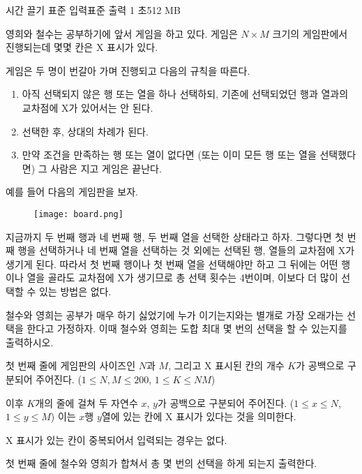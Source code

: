 \begin{problem}{시간 끌기}
    {표준 입력}{표준 출력}
    {1 초}{512 MB}{}
    
    영희와 철수는 공부하기에 앞서 게임을 하고 있다. 게임은 $ N \times M $ 크기의 게임판에서 진행되는데 몇몇 칸은 X 표시가 있다.
    
    게임은 두 명이 번갈아 가며 진행되고 다음의 규칙을 따른다.
    
    \begin{enumerate}
        \item 아직 선택되지 않은 행 또는 열을 하나 선택하되, 기존에 선택되었던 행과 열과의 교차점에 X가 있어서는 안 된다.
        \item 선택한 후, 상대의 차례가 된다.
        \item 만약 조건을 만족하는 행 또는 열이 없다면 (또는 이미 모든 행 또는 열을 선택했다면) 그 사람은 지고 게임은 끝난다.
    \end{enumerate}
    예를 들어 다음의 게임판을 보자.
    
    \begin{figure}[h]
        \centering
        \texttt{[image: board.png]}
    \end{figure}
    
    지금까지 두 번째 행과 네 번째 행, 두 번째 열을 선택한 상태라고 하자. 그렇다면 첫 번째 행을 선택하거나 네 번째 열을 선택하는 것 외에는 선택된 행, 열들의 교차점에 X가 생기게 된다. 따라서 첫 번째 행이나 첫 번째 열을 선택해야만 하고 그 뒤에는 어떤 행이나 열을 골라도 교차점에 X가 생기므로 총 선택 횟수는 4번이며, 이보다 더 많이 선택할 수 있는 방법은 없다.
    
    철수와 영희는 공부가 매우 하기 싫었기에 누가 이기는지와는 별개로 가장 오래가는 선택을 한다고 가정하자. 이때 철수와 영희는 도합 최대 몇 번의 선택을 할 수 있는지를 출력하시오.
    
    \InputFile
    첫 번째 줄에 게임판의 사이즈인 $ N $과 $ M $, 그리고 X 표시된 칸의 개수 $ K $가 공백으로 구분되어 주어진다. ($ 1 \leq N, M \leq 200 $, $ 1 \leq K \leq NM $)
    
    이후 $ K $개의 줄에 걸쳐 두 자연수 $ x $, $ y $가 공백으로 구분되어 주어진다. ($ 1 \leq x \leq N $, $ 1 \leq y \leq M $) 이는 $ x $행 $ y $열에 있는 칸에 X 표시가 있다는 것을 의미한다.
    
    X 표시가 있는 칸이 중복되어서 입력되는 경우는 없다.
    
    \OutputFile
    첫 번째 줄에 철수와 영희가 합쳐서 총 몇 번의 선택을 하게 되는지 출력한다.
    
    \Examples
    
    \begin{example}
    \end{example}
    
\end{problem}

